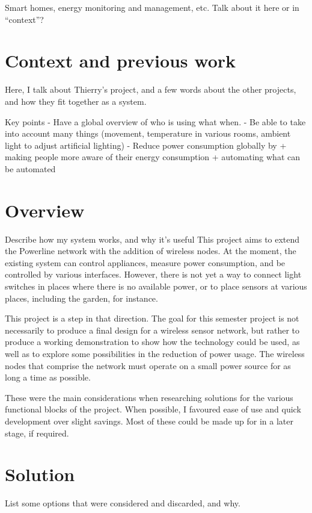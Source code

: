 Smart homes, energy monitoring and management, etc. Talk about it here or in
``context''?

\section{Context and previous work}
Here, I talk about Thierry's project, and a few words about the other projects,
and how they fit together as a system.

Key points
  - Have a global overview of who is using what when.
  - Be able to take into account many things (movement, temperature in various
  rooms, ambient light to adjust artificial lighting)
  - Reduce power consumption globally by
    + making people more aware of their energy consumption
    + automating what can be automated

\section{Overview}
Describe how my system works, and why it's useful
This project aims to extend the Powerline network with the addition of wireless
nodes. At the moment, the existing system can control appliances, measure power
consumption, and be controlled by various interfaces. However, there is not yet
a way to connect light switches in places where there is no available power, or
to place sensors at various places, including the garden, for instance.

This project is a step in that direction. The goal for this semester project is
not necessarily to produce a final design for a wireless sensor network, but
rather to produce a working demonstration to show how the technology could be
used, as well as to explore some possibilities in the reduction of power usage.
The wireless nodes that comprise the network must operate on a small power
source for as long a time as possible.

These were the main considerations when researching solutions for the various
functional blocks of the project. When possible, I favoured ease of use and
quick development over slight savings. Most of these could be made up for in a
later stage, if required.

\section{Solution}
List some options that were considered and discarded, and why.

